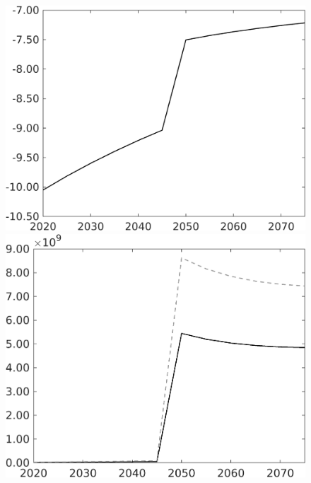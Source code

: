 \begin{figure}[h!!]
\begin{minipage}[]{0.32\textwidth}
 	\includegraphics[width=1\textwidth]{../../codding_model/own_basedOnFried/optimalPol_010922_revision/figures/all_13Sept22/CompTaufPER_bytaul_Reg0_tauf_spillover0_nsk0_xgr0_knspil0_sep0_LFlimit1_emsbase0_countec0_GovRev0_etaa0.79_lgd0.png} \end{minipage}		
\begin{minipage}[]{0.32\textwidth}
\includegraphics[width=1\textwidth]{../../codding_model/own_basedOnFried/optimalPol_010922_revision/figures/all_13Sept22/CompTauf_bytaul_Reg0_sgsff_spillover0_nsk0_xgr0_knspil0_sep0_LFlimit1_emsbase0_countec0_GovRev0_etaa0.79_lgd0.png}

\end{minipage}
\end{figure}
